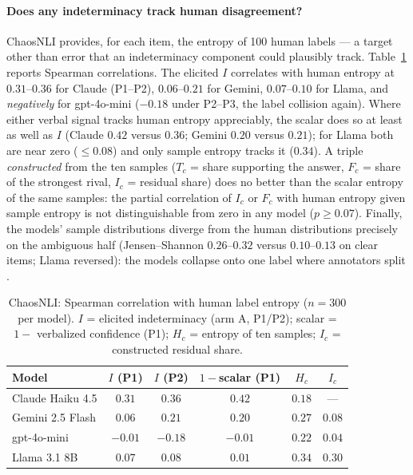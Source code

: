 \documentclass[11pt]{article}
\begin{document}
\paragraph{Does any indeterminacy track human disagreement?} ChaosNLI provides, for each item,
the entropy of 100 human labels --- a target other than error that an indeterminacy component
could plausibly track. Table~\ref{tab:human} reports Spearman correlations. The elicited $I$
correlates with human entropy at $0.31$--$0.36$ for Claude (P1--P2), $0.06$--$0.21$ for Gemini,
$0.07$--$0.10$ for Llama, and \emph{negatively} for gpt-4o-mini ($-0.18$ under P2--P3, the
label collision again). Where either verbal signal tracks human entropy appreciably, the scalar does so at least as
well as $I$ (Claude $0.42$ versus $0.36$; Gemini $0.20$ versus $0.21$); for Llama both are
near zero ($\leq0.08$) and only sample entropy tracks it ($0.34$). A triple \emph{constructed} from the ten samples
($T_c$ = share supporting the answer, $F_c$ = share of the strongest rival, $I_c$ = residual
share) does no better than the scalar entropy of the same samples: the partial correlation of
$I_c$ or $F_c$ with human entropy given sample entropy is not distinguishable from zero in any
model ($p\geq0.07$). Finally, the models' sample distributions diverge from the human
distributions precisely on the ambiguous half (Jensen--Shannon $0.26$--$0.32$ versus
$0.10$--$0.13$ on clear items; Llama reversed): the models collapse onto one label where
annotators split \citep{baan2022stop}.

\begin{table}[t]
\centering
\caption{ChaosNLI: Spearman correlation with human label entropy ($n=300$ per model).
$I$ = elicited indeterminacy (arm A, P1/P2); scalar = $1-$ verbalized confidence (P1);
$H_c$ = entropy of ten samples; $I_c$ = constructed residual share.}
\label{tab:human}
\small
\begin{tabular}{lccccc}
\toprule
Model & $I$ (P1) & $I$ (P2) & $1-$scalar (P1) & $H_c$ & $I_c$ \\
\midrule
Claude Haiku 4.5   & $0.31$ & $0.36$ & $0.42$ & $0.18$ & --- \\
Gemini 2.5 Flash   & $0.06$ & $0.21$ & $0.20$ & $0.27$ & $0.08$ \\
gpt-4o-mini        & $-0.01$ & $-0.18$ & $-0.01$ & $0.22$ & $0.04$ \\
Llama 3.1 8B       & $0.07$ & $0.08$ & $0.01$ & $0.34$ & $0.30$ \\
\bottomrule
\end{tabular}
\end{table}
\end{document}
